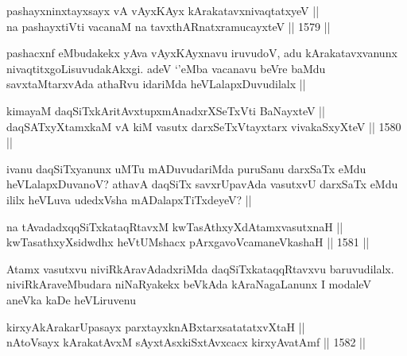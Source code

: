 
\begin{shl}
pashayxninxtayxsayx vA vAyxKAyx kArakatavxnivaqtatxyeV || \\
na pashayxtiVti vacanaM na tavxthARnatxramucayxteV \hfill || 1579 ||  
\end{shl}

\begin{artha}
pashacxnf eMbudakekx yAva vAyxKAyxnavu iruvudoV, adu kArakatavxvanunx nivaqtitxgoLisuvudakAkxgi. adeV `\stext'eMba vacanavu beVre baMdu savxtaMtarxvAda athaRvu idariMda heVLalapxDuvudilalx ||
\end{artha}


\begin{shl}
kimayaM daqSiTxkAritAvxtupxmAnadxrXSeTxVti BaNayxteV || \\
daqSATxyXtamxkaM vA kiM vasutx darxSeTxVtayxtarx vivakaSxyXteV \hfill || 1580 ||  
\end{shl}

\begin{artha}
ivanu daqSiTxyanunx uMTu mADuvudariMda puruSanu darxSaTx eMdu heVLalapxDuvanoV? athavA daqSiTx savxrUpavAda vasutxvU darxSaTx eMdu ililx heVLuva udedxVsha mADalapxTiTxdeyeV? ||
\end{artha}


\begin{shl}
na tAvadadxqqSiTxkataqRtavxM kwTasAthxyXdAtamxvasutxnaH || \\
kwTasathxyXsidwdhx heVtUMshacx pArxgavoVcamaneVkashaH \hfill || 1581 ||  
\end{shl}

\begin{artha}
Atamx vasutxvu niviRkAravAdadxriMda daqSiTxkataqqRtavxvu baruvudilalx. niviRkAraveMbudara niNaRyakekx beVkAda kAraNagaLanunx I modaleV aneVka kaDe heVLiruvenu
\end{artha}

\begin{shl}
kirxyAkArakarUpasayx parxtayxknABxtarxsatatatxvXtaH ||  \\
nAtoV\s sayx kArakatAvxM sAyxtAsxkiSxtAvxcacx kirxyAvatAmf \hfill || 1582 ||  
\end{shl}

